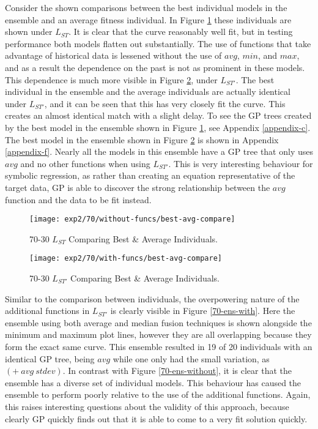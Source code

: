 \documentclass[12pt, letterpaper]{article}
\begin{document}
\textrm{ \indent Consider the shown comparisons between the best individual models in the ensemble and an average fitness individual. In Figure \ref{70-inds-without} these individuals are shown under $L_{ST}$. It is clear that the curve reasonably well fit, but in testing performance both models flatten out substantially. The use of functions that take advantage of historical data is lessened without the use of $avg$, $min$, and $max$, and as a result the dependence on the past is not as prominent in these models. This dependence is much more visible in Figure \ref{70-inds-with}, under $L_{ST'}$. The best individual in the ensemble and the average individuals are actually identical under $L_{ST'}$, and it can be seen that this has very closely fit the curve. This creates an almost identical match with a slight delay. To see the GP trees created by the best model in the ensemble shown in Figure \ref{70-inds-without}, see Appendix \ref{appendix-c}. The best model in the ensemble shown in Figure \ref{70-inds-with} is shown in Appendix \ref{appendix-f}. Nearly all the models in this ensemble have a GP tree that only uses $avg$ and no other functions when using $L_{ST'}$. This is very interesting behaviour for symbolic regression, as rather than creating an equation representative of the target data, GP is able to discover the strong relationship between the $avg$ function and the data to be fit instead.}

\begin{figure}[!htb]
\centering
\texttt{[image: exp2/70/without-funcs/best-avg-compare]}
\caption{ 70-30 $L_{ST}$ Comparing Best \& Average Individuals.}
\label{70-inds-without}
\end{figure}

\begin{figure}[!htb]
\centering
\texttt{[image: exp2/70/with-funcs/best-avg-compare]}
\caption{ 70-30 $L_{ST'}$ Comparing Best \& Average Individuals.}
\label{70-inds-with}
\end{figure}

\textrm{ \indent Similar to the comparison between individuals, the overpowering nature of the additional functions in $L_{ST'}$ is clearly visible in Figure \ref{70-ens-with}. Here the ensemble using both average and median fusion techniques is shown alongside the minimum and maximum plot lines, however they are all overlapping because they form the exact same curve. This ensemble resulted in 19 of 20 individuals with an identical GP tree, being $avg$ while one only had the small variation, as $(+\ avg\ stdev)$. In contrast with Figure \ref{70-ens-without}, it is clear that the ensemble has a diverse set of individual models. This behaviour has caused the ensemble to perform poorly relative to the use of the additional functions. Again, this raises interesting questions about the validity of this approach, because clearly GP quickly finds out that it is able to come to a very fit solution quickly. }
\end{document}
